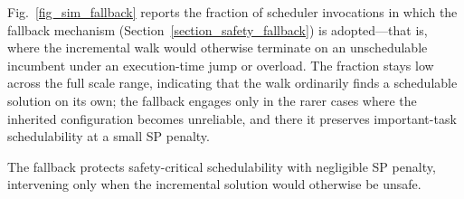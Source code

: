 Fig.~\ref{fig_sim_fallback} reports the fraction of scheduler invocations in which the fallback
mechanism (Section~\ref{section_safety_fallback}) is adopted---that is, where the incremental walk would
otherwise terminate on an unschedulable incumbent under an execution-time jump or overload.
The fraction stays low across the full scale range, indicating that the walk ordinarily finds a
schedulable solution on its own; the fallback engages only in the rarer cases where the inherited
configuration becomes unreliable, and there it preserves important-task schedulability at a small SP
penalty.

The fallback protects safety-critical schedulability with negligible SP penalty, intervening only when
the incremental solution would otherwise be unsafe.
